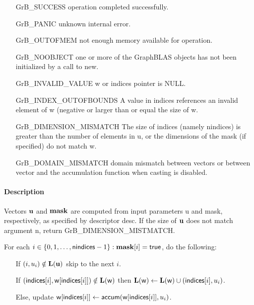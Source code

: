 \begin{itemize}[leftmargin=2.1in]
\item[{\sf GrB\_SUCCESS}]      operation completed successfully.
\item[{\sf GrB\_PANIC}]        unknown internal error.
\item[{\sf GrB\_OUTOFMEM}]     not enough memory available for operation.
\item[{\sf GrB\_NOOBJECT}]          one or more of the GraphBLAS objects has
                                    not been initialized by a call to {\sf new}.
\item[{\sf GrB\_INVALID\_VALUE}]    {\sf w} or {\sf indices} pointer is {\sf NULL}.

\item[{\sf GrB\_INDEX\_OUTOFBOUNDS}]
        A value in {\sf indices} references an invalid element of {\sf w} (negative or larger than or equal the size of {\sf w}.
\item[{\sf GrB\_DIMENSION\_MISMATCH}] 
        The size of {\sf indices} (namely {\sf nindices}) is greater than the number of elements in {\sf u}, or
        the dimensions of the mask (if specified) do not match {\sf w}.
\item[\sf GrB\_DOMAIN\_MISMATCH]  
       domain mismatch between vectors or between vector and the accumulation function when casting is disabled.
\end{itemize}

\paragraph{Description}

Vectors ${\bf u}$ and ${\bf mask}$ are computed from input parameters {\sf u} and {\sf mask}, respectively, as specified by descriptor {\sf desc}. If
the size of ${\bf u}$ does not match argument {\sf n}, return {\sf GrB\_DIMENSION\_MISTMATCH}.

For each $i \in \{0, 1, \ldots, {\sf nindices}-1 \} : {\bf mask}[i] = {\sf true}$, do the following:
\begin{itemize}
	\item[] If $(i, u_i) \notin \bold{L}({\bf u})$ skip to the next $i$.
	\item[] If $({\sf indices}[i], {\sf w}[{\sf indices}[i]]) \notin \bold{L}({\sf w})$ then
	      $\bold{L}({\sf w}) \leftarrow \bold{L}({\sf w}) \cup ({\sf indices}[i],u_i)$.
	\item[] Else, update ${\sf w}[{\sf indices}[i]] \leftarrow {\sf accum}({\sf w}[{\sf indices}[i]],u_i)$.
\end{itemize}


